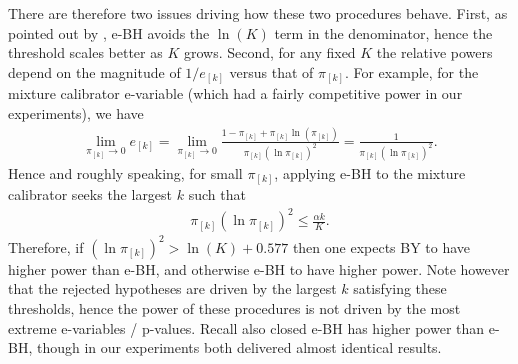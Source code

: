 \documentclass[pdflatex,sn-mathphys-num]{sn-jnl}%
\theoremstyle{thmstyleone}%
\theoremstyle{thmstyletwo}%
\theoremstyle{thmstylethree}%
\begin{document}
There are therefore two issues driving how these two procedures behave. 
First, as pointed out by \cite{wang_ruodu:2022}, e-BH avoids the $\ln(K)$ term in the denominator, hence the threshold scales better as $K$ grows. 
Second, for any fixed $K$ the relative powers depend on the magnitude of $1/e_{[k]}$ versus that of $\pi_{[k]}$. For example, for the mixture calibrator e-variable (which had a fairly competitive power in our experiments), we have
\begin{align}
\lim_{\pi_{[k]} \to 0} e_{[k]}= \lim_{\pi_{[k]} \to 0} \frac{1 - \pi_{[k]} + \pi_{[k]} \ln(\pi_{[k]})}{\pi_{[k]} (\ln \pi_{[k]})^2}
= \frac{1}{\pi_{[k]} (\ln \pi_{[k]})^2}.
\nonumber
\end{align}
Hence and roughly speaking, for small $\pi_{[k]}$, applying e-BH to the mixture calibrator seeks the largest $k$ such that
\begin{align}
 \pi_{[k]} (\ln \pi_{[k]})^2 \leq \frac{\alpha k}{K}.
\nonumber
\end{align}
Therefore, if $(\ln \pi_{[k]})^2 > \ln(K) + 0.577$ then one expects BY to have higher power than e-BH, and otherwise e-BH to have higher power. Note however that the rejected hypotheses are driven by the largest $k$ satisfying these thresholds, hence the power of these procedures is not driven by the most extreme e-variables / p-values.
Recall also closed e-BH has higher power than e-BH, though in our experiments both delivered almost identical results. 


\end{document}
